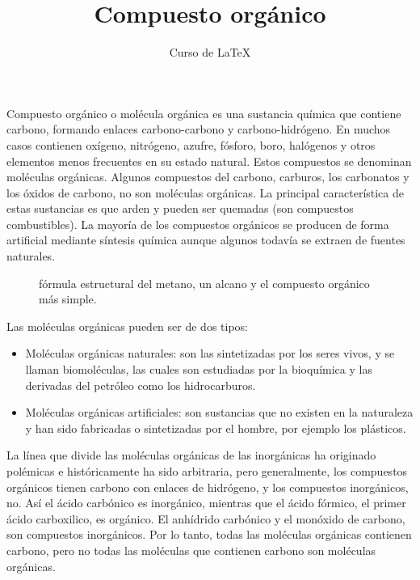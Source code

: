 \documentclass[12pt,letterpaper]{article}
\title{Compuesto orgánico}
\author{Curso de \LaTeX}
\begin{document}
\maketitle

Compuesto orgánico o molécula orgánica es una sustancia química que contiene carbono, formando enlaces carbono-carbono y carbono-hidrógeno. En muchos casos contienen oxígeno, nitrógeno, azufre, fósforo, boro, halógenos y otros elementos menos frecuentes en su estado natural. Estos com\-pues\-tos se denominan moléculas or\-gá\-ni\-cas. Algunos com\-pues\-tos del carbono, carburos, los carbonatos y los óxidos de carbono, no son moléculas or\-gá\-ni\-cas. La principal característica de estas sustancias es que arden y pueden ser quemadas (son compuestos combustibles). La mayoría de los compuestos orgánicos se producen de forma artificial mediante síntesis química aunque algunos todavía se extraen de fuentes naturales.


\begin{figure}[h]
	\begin{center}
		\centering
	\end{center}
	\vspace{-5mm}
	\caption{fórmula estructural del metano, un alcano y el compuesto orgánico más simple.}
\end{figure}


Las moléculas orgánicas pueden ser de dos tipos:

\begin{itemize}
	\item 	Moléculas orgánicas naturales: son las sintetizadas por los seres vivos, y se llaman biomoléculas, las cuales son estudiadas por la bioquímica y las derivadas del petróleo como los hidrocarburos.
	\item 	Moléculas orgánicas artificiales: son sustancias que no existen en la naturaleza y han sido fabricadas o sintetizadas por el hombre, por ejemplo los plásticos.
\end{itemize}




La línea que divide las moléculas orgánicas de las inorgánicas ha originado polémicas e históricamente ha sido arbitraria, pero generalmente, los compuestos orgánicos tienen carbono con enlaces de hidrógeno, y los compuestos inorgánicos, no. Así el ácido carbónico es inorgánico, mientras que el ácido fórmico, el primer ácido carboxilico, es orgánico. El anhídrido carbónico y el monóxido de carbono, son compuestos inorgánicos. Por lo tanto, todas las moléculas orgánicas contienen carbono, pero no todas las moléculas que contienen carbono son moléculas orgánicas.
\end{document}
